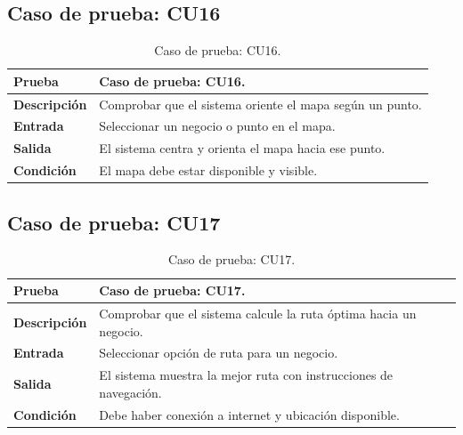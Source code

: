 
\subsection{Caso de prueba: CU16}

\begin{table}[ht]
\centering
\renewcommand{\arraystretch}{1.3}
\begin{tabular}{|p{3cm}|p{12cm}|}
\hline
\rowcolor[RGB]{191,191,191}
\textbf{Prueba} & Caso de prueba: CU16. \\
\hline
\textbf{Descripción} \cellcolor[RGB]{217,217,217} & Comprobar que el sistema oriente el mapa según un punto. \\
\hline
\textbf{Entrada} \cellcolor[RGB]{217,217,217} & Seleccionar un negocio o punto en el mapa. \\
\hline
\textbf{Salida} \cellcolor[RGB]{217,217,217} & El sistema centra y orienta el mapa hacia ese punto. \\
\hline
\textbf{Condición} \cellcolor[RGB]{217,217,217} & El mapa debe estar disponible y visible. \\
\hline
\end{tabular}
\caption{Caso de prueba: CU16.}
\label{tab:cu16_black_test}
\end{table}


\subsection{Caso de prueba: CU17}

\begin{table}[ht]
\centering
\renewcommand{\arraystretch}{1.3}
\begin{tabular}{|p{3cm}|p{12cm}|}
\hline
\rowcolor[RGB]{191,191,191}
\textbf{Prueba} & Caso de prueba: CU17. \\
\hline
\textbf{Descripción} \cellcolor[RGB]{217,217,217} & Comprobar que el sistema calcule la ruta óptima hacia un negocio. \\
\hline
\textbf{Entrada} \cellcolor[RGB]{217,217,217} & Seleccionar opción de ruta para un negocio. \\
\hline
\textbf{Salida} \cellcolor[RGB]{217,217,217} & El sistema muestra la mejor ruta con instrucciones de navegación. \\
\hline
\textbf{Condición} \cellcolor[RGB]{217,217,217} & Debe haber conexión a internet y ubicación disponible. \\
\hline
\end{tabular}
\caption{Caso de prueba: CU17.}
\label{tab:cu17_black_test}
\end{table}

